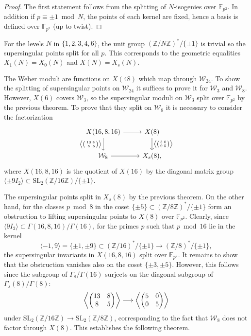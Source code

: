 \documentclass{amsart}
\newcommand{\cW}{\mathcal{W}}
\newcommand{\FF}{\mathbb{F}}
\newcommand{\ZZ}{\mathbb{Z}}
\newcommand{\SL}{\mathrm{SL}}
\begin{document}
\begin{proof}
  The first statement follows from the splitting of $N$-isogenies over $\FF_{p^2}$.
  In addition if $p \equiv \pm1 \bmod N$, the points of each kernel are fixed,
  hence a basis is defined over $\FF_{p^2}$ (up to twist).
\end{proof}

 For the levels $N$ in $\{1,2,3,4,6\}$, the unit
group $(\ZZ/N\ZZ)^*/\{\pm1\}$ is trivial so the supersingular points
split for all $p$. This corresponds to the geometric equalities $X_1(N) = X_0(N)$
and $X(N) = X_s(N)$.
\vspace{2mm}

The Weber moduli are functions on $X(48)$ which map through $\cW_{24}$.
To show the splitting of supersingular points on $\cW_{24}$ it suffices to prove
it for $\cW_3$ and $\cW_8$. However, $X(6)$ covers $\cW_3$, so the supersingular
moduli on $\cW_3$ split over $\FF_{p^2}$ by the previous theorem. To prove that
they split on $\cW_8$ it is necessary to consider the factorization
$$
\begin{tikzcd}
  X(16,8,16) \arrow[d,"\big\langle\binom{\,13\;8\,}{\,\;8\;\;5\,}\big\rangle" swap]\arrow[r]
  & X(8) \arrow[d,"\big\langle\binom{\,5\;0\,}{\,0\;5\,}\big\rangle"]\\
  \cW_8 \arrow[r] & X_s(8),
\end{tikzcd}
$$
where $X(16,8,16)$ is the quotient of $X(16)$ by the diagonal matrix group
$\langle\pm 9I_2\rangle \subset \SL_2(\ZZ/16\ZZ)/\{\pm1\}$.

The supersingular points split in $X_s(8)$ by the previous theorem.
On the other hand, for the classes $p \bmod 8$ in the coset
$\{ \pm5 \} \subset (\ZZ/8\ZZ)^*/\{\pm1\}$ form an obstruction to lifting
supersingular points to $X(8)$ over $\FF_{p^2}$.
Clearly, since $\langle{9I_2}\rangle \subset \Gamma(16,8,16)/\Gamma(16)$,
for the primes $p$ such that $p \bmod 16$ lie in the kernel
$$
\langle{-1,9}\rangle = \{\pm1,\pm9\} \subset (\ZZ/16)^*/\{\pm1\} \longrightarrow (\ZZ/8)^*/\{\pm1\},
$$
the supersingular invariants in $X(16,8,16)$ split over $\FF_{p^2}$.  It remains
to show that the obstruction vanishes also on the coset $\{\pm3,\pm5\}$.  However, this
follows since the subgroup of $\Gamma_8/\Gamma(16)$ surjects on the diagonal subgroup
of $\Gamma_s(8)/\Gamma(8)$:
$$
\left\langle\left(\begin{array}{@{}cc@{}}13&8\\8&5\end{array}\right)\right\rangle
  \longrightarrow
\left\langle\left(\begin{array}{@{}cc@{}}5&0\\0&5\end{array}\right)\right\rangle
$$
under $\SL_2(\ZZ/16\ZZ) \to \SL_2(\ZZ/8\ZZ)$, corresponding to the fact that $\cW_8$
does not factor through $X(8)$.  This establishes the following theorem.
\end{document}
